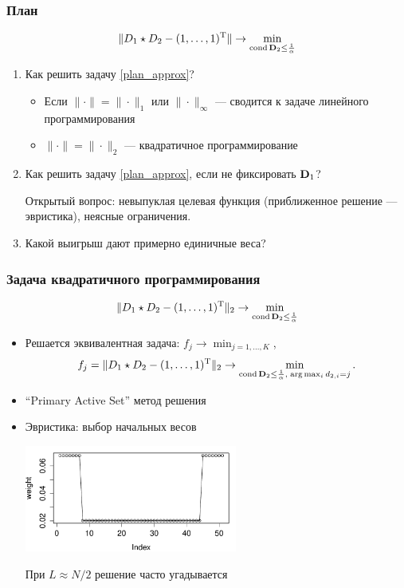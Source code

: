\documentclass[unicode, notheorems]{beamer}
\DeclareMathOperator{\cond}{cond}
\begin{document}
\begin{frame}
	\frametitle{План}
	\begin{equation}\label{plan_approx}
	\|D_1 \star D_2 - (1, \ldots, 1)^\rmT\| \to \min_{\cond \bfD_2 \le \frac{1}{\alpha}}
	\end{equation}
	
	\begin{enumerate}
		\item Как решить задачу \eqref{plan_approx}?
		\begin{itemize}
			\item
		Если $\|\cdot\| = \|\cdot\|_1$ или $\|\cdot\|_\infty$ --- сводится к задаче линейного программирования
		\item \pause
		$\|\cdot\| = \|\cdot\|_2$ --- квадратичное программирование	
		\end{itemize}

		
		\pause
		\item Как решить задачу \eqref{plan_approx}, если не фиксировать $\mathbf{D}_1$?
		
		\pause
		Открытый вопрос: невыпуклая целевая функция (приближенное решение --- эвристика), неясные ограничения.
		\item Какой выигрыш дают примерно единичные веса?
	\end{enumerate}
	
\end{frame}

\begin{frame}
	\frametitle{Задача квадратичного программирования}
	\vspace{-0.4cm}
	\begin{equation*}
	\|D_1 \star D_2 - (1, \ldots, 1)^\rmT\|_2 \to \min_{\cond \bfD_2 \le \frac{1}{\alpha}}
	\end{equation*}
	\vspace{-0.2cm}
	\begin{itemize}
		\item Решается эквивалентная задача:
		$f_j \to \min_{j = 1, \ldots, K}$, 
		\begin{equation*}
	    f_j = \|D_1 \star D_2 - (1, \ldots, 1)^\rmT\|_2 \to \min_{\cond \bfD_2 \le \frac{1}{\alpha}, \; \arg \max_i d_{2, i} = j}.
		\end{equation*}
		\item ``Primary Active Set'' метод решения
		\item Эвристика: выбор начальных весов

	\vspace{-0.18cm}
	    \begin{center}
		    \includegraphics*[width = 7cm]{qpsp.pdf}
    	\end{center}		
		При $L \approx N/2$ решение часто угадывается
	\end{itemize}
\end{frame}
\end{document}
